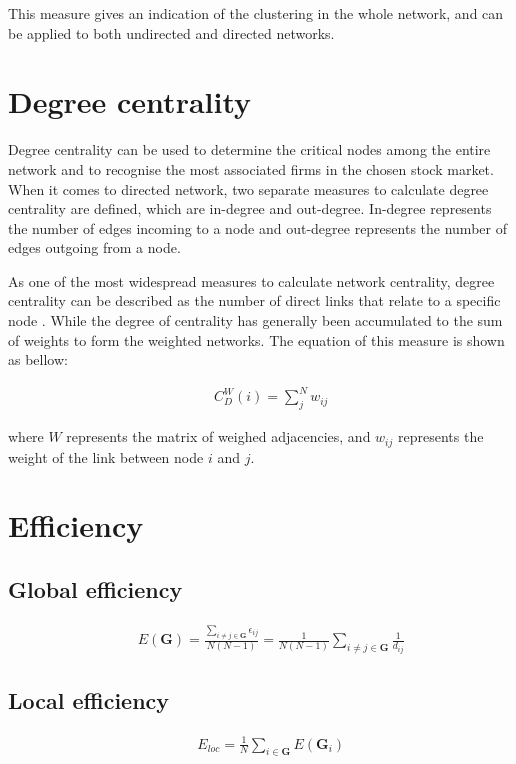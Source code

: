 This measure gives an indication of the clustering in the whole network, and can be applied to both undirected and directed networks.

\section{Degree centrality}
Degree centrality can be used to determine the critical nodes among the entire network and to recognise the most associated firms in the chosen stock market. When it comes to directed network, two separate measures to calculate degree centrality are defined, which are in-degree and out-degree. In-degree represents the number of edges incoming to a node and out-degree represents the number of edges outgoing from a node.

As one of the most widespread measures to calculate network centrality, degree centrality can be described as the number of direct links that relate to a specific node \cite{freeman}. While the degree of centrality has generally been accumulated to the sum of weights to form the weighted networks. The equation of this measure is shown as bellow:

\begin{eqnarray}
&&C_D^W(i)=\sum_{j}^{N}w_{ij}
\end{eqnarray}

where $W$ represents the matrix of weighed adjacencies, and $w_{ij}$ represents the weight of the link between node $i$ and $j$.

\section{Efficiency}
\cite{latora2001efficient}
\subsection{Global efficiency}
\begin{eqnarray}
&&E(\textbf{G})=\frac{\sum_{i \neq j \in \textbf{G}} \epsilon_{ij}}{N(N-1)}=\frac{1}{N(N-1)}\sum_{i \neq j \in \textbf{G}} \frac{1}{d_{ij}}
\end{eqnarray}

\subsection{Local efficiency}
\begin{eqnarray}
&&E_{loc}=\frac{1}{N} \sum_{i \in \textbf{G}} E(\textbf{G}_i)
\end{eqnarray}

